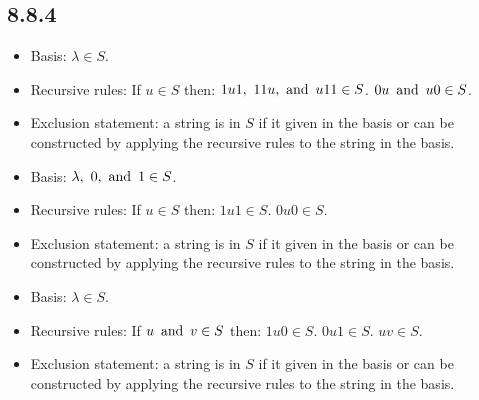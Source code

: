 \documentclass{article}
\begin{document}
\subsection*{8.8.4}
\begin{enumerate}
  \begin{itemize}
    \item Basis: $\lambda \in S$.
    \item Recursive rules: If $u \in S$ then:
           $1u1,~11u, \operatorname{~\text{and}~} u11 \in S$.
           $0u \operatorname{~\text{and}~} u0 \in S$.
    \item Exclusion statement: a string is in $S$ if it given in the basis or can be constructed by applying the recursive rules to the string in the basis.
  \end{itemize}
  \begin{itemize}
    \item Basis: $\lambda,~0, \operatorname{~\text{and}~} 1 \in S$.
    \item Recursive rules: If $u \in S$ then:
           $1u1 \in S$.
           $0u0 \in S$.
    \item Exclusion statement: a string is in $S$ if it given in the basis or can be constructed by applying the recursive rules to the string in the basis.
  \end{itemize}
  \begin{itemize}
    \item Basis: $\lambda \in S$.
    \item Recursive rules: If $u \operatorname{~\text{and}~} v \in S$ then:
           $1u0 \in S$.
           $0u1 \in S$.
           $uv \in S$.
    \item Exclusion statement: a string is in $S$ if it given in the basis or can be constructed by applying the recursive rules to the string in the basis.
  \end{itemize}
\end{enumerate}
\end{document}
